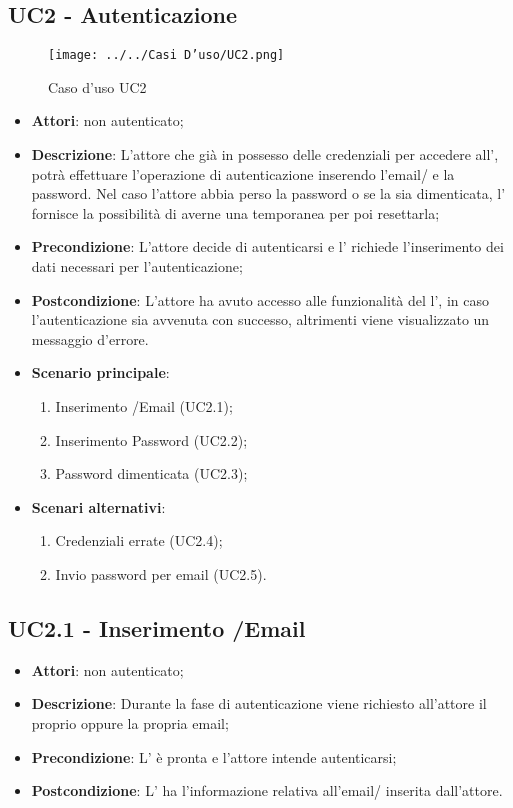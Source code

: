 \subsection{UC2 - Autenticazione}
\label{ssec:UC2}
\begin{figure}[h!]
\centering
\texttt{[image: ../../Casi D'uso/UC2.png]}
\caption{Caso d'uso UC2}
 \end{figure}
\begin{itemize}
\item \textbf{Attori}:  non autenticato;
\item \textbf{Descrizione}: L'attore che già in possesso delle credenziali per accedere all', potrà effettuare l'operazione di autenticazione inserendo l'email/ e la password. Nel caso l’attore abbia perso la password o se la sia dimenticata, l' fornisce la possibilità di averne una temporanea per poi resettarla;
\item \textbf{Precondizione}: L'attore decide di autenticarsi e l' richiede l'inserimento dei dati necessari per l'autenticazione;
\item \textbf{Postcondizione}: L'attore ha avuto accesso alle funzionalità del l', in caso l'autenticazione sia avvenuta con successo, altrimenti viene visualizzato un messaggio d'errore.
\item \textbf{Scenario principale}: \begin{enumerate}\item Inserimento /Email (UC2.1);\item Inserimento Password (UC2.2);\item Password dimenticata (UC2.3);  \end{enumerate}

\item \textbf{Scenari alternativi}: \begin{enumerate}
\item Credenziali errate (UC2.4);\item Invio password per email (UC2.5). \end{enumerate}

\end{itemize}
\subsection{UC2.1 - Inserimento /Email}
\label{ssec:UC2.1}
\begin{itemize}
\item \textbf{Attori}:  non autenticato;
\item \textbf{Descrizione}: Durante la fase di autenticazione viene richiesto all'attore il proprio  oppure la propria email;
\item \textbf{Precondizione}: L' è pronta e l'attore intende autenticarsi;
\item \textbf{Postcondizione}: L' ha l’informazione relativa all'email/ inserita dall’attore.
\end{itemize}
